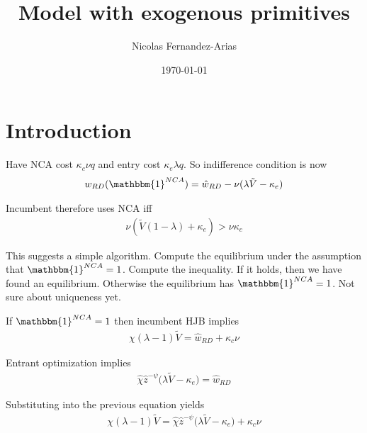 \documentclass[11pt,english]{article}
\begin{document}
	
\title{Model with exogenous primitives}

\author{Nicolas Fernandez-Arias} 

\date{\today}

\maketitle




\section{Introduction}

Have NCA cost $\kappa_c \nu q$ and entry cost $\kappa_e \lambda q$. So indifference condition is now 
\begin{align}
	w_{RD}(\mathbbm{1}^{NCA}) = \hat{w}_{RD} - \nu (\lambda \tilde{V} - \kappa_e)
\end{align}

Incumbent therefore uses NCA iff
\begin{align}
	\nu (\tilde{V}(1-\lambda) + \kappa_e ) > \nu \kappa_c 
\end{align}

This suggests a simple algorithm. Compute the equilibrium under the assumption that $\mathbbm{1}^{NCA} = 1$. Compute the inequality. If it holds, then we have found an equilibrium. Otherwise the equilibrium has $\mathbbm{1}^{NCA} = 1$. Not sure about uniqueness yet.

If $\mathbbm{1}^{NCA} = 1$ then incumbent HJB implies
\begin{align}
	\chi (\lambda - 1) \tilde{V} = \hat{w}_{RD} + \kappa_c \nu 
\end{align}

Entrant optimization implies
\begin{align}
	\hat{\chi} \hat{z}^{-\psi} \Big( \lambda \tilde{V} - \kappa_e  \Big) = \hat{w}_{RD}
\end{align}

Substituting into the previous equation yields
\begin{align}
	\chi(\lambda -1) \tilde{V} = \hat{\chi} \hat{z}^{-\psi} \Big( \lambda \tilde{V} - \kappa_e \Big) + \kappa_c \nu 
\end{align}
\end{document}
